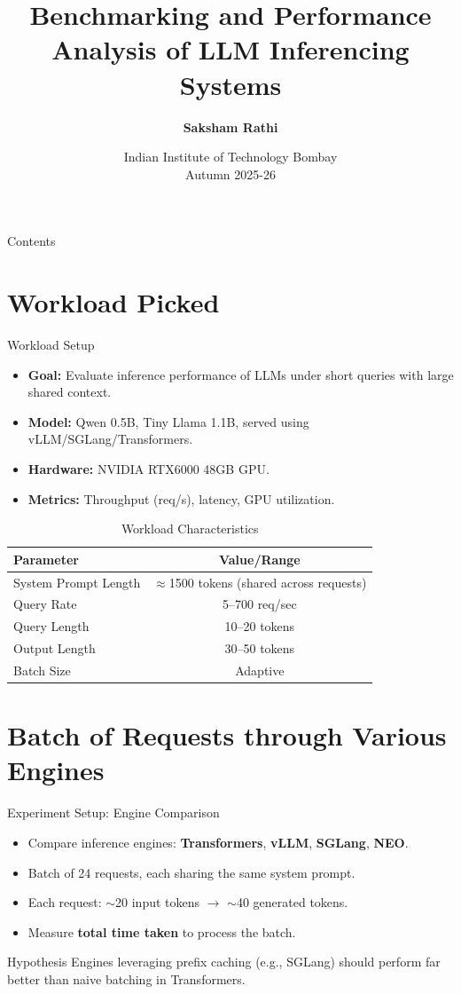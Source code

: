 \documentclass[Serif, 10pt, brown]{beamer}
\title[{Systems for LLMs}]{\sc Benchmarking and Performance Analysis of LLM Inferencing Systems}
\author[\ul{Saksham Rathi}]{{\textbf{Saksham Rathi}}}
\institute[UTD]{\sc\small Bachelor's Thesis Project\\ Under Prof. Mythili Vutukuru}
\date[UCI]{Indian Institute of Technology Bombay \\ Autumn 2025-26}
\theoremstyle{example}
\theoremstyle{plain}
\begin{document}
\frame{\titlepage}

\begin{frame}{Contents}
	\tableofcontents
\end{frame}

\section{Workload Picked}

\begin{frame}{Workload Setup}
\begin{itemize}
    \item \textbf{Goal:} Evaluate inference performance of LLMs under short queries with large shared context.
    \item \textbf{Model:} Qwen 0.5B, Tiny Llama 1.1B, served using vLLM/SGLang/Transformers.
    \item \textbf{Hardware:} NVIDIA RTX6000 48GB GPU.
    \item \textbf{Metrics:} Throughput (req/s), latency, GPU utilization.
\end{itemize}

\begin{table}[h!]
\centering
\scriptsize
\begin{tabular}{|l|c|}
\hline
\textbf{Parameter} & \textbf{Value/Range} \\
\hline
System Prompt Length & $\approx$1500 tokens (shared across requests) \\
Query Rate & 5–700 req/sec \\
Query Length & 10–20 tokens \\
Output Length & 30–50 tokens \\
Batch Size & Adaptive \\
\hline
\end{tabular}
\caption{Workload Characteristics}
\end{table}
\end{frame}


\section{Batch of Requests through Various Engines}
\begin{frame}{Experiment Setup: Engine Comparison}
\begin{itemize}
    \item Compare inference engines: \textbf{Transformers}, \textbf{vLLM}, \textbf{SGLang}, \textbf{NEO}.
    \item Batch of 24 requests, each sharing the same system prompt.
    \item Each request: $\sim$20 input tokens $\rightarrow$ $\sim$40 generated tokens.
    \item Measure \textbf{total time taken} to process the batch.
\end{itemize}

\begin{block}{Hypothesis}
Engines leveraging prefix caching (e.g., SGLang) should perform far better than naive batching in Transformers.
\end{block}
\end{frame}
\end{document}
